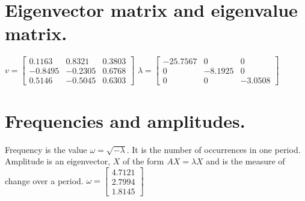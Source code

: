 \documentclass{article}
\begin{document}
\section{Eigenvector matrix and eigenvalue matrix.}
\(v = 
	\begin{bmatrix}
	 0.1163	&	0.8321	&	0.3803 \\
	 -0.8495	&	-0.2305	&	0.6768 \\
	 0.5146	&	-0.5045	&	0.6303
	\end{bmatrix} \)
\(\lambda =
	\begin{bmatrix}
	-25.7567	&	0		&	0 \\
	0		&	-8.1925	&	0 \\
	0		&	0		&	-3.0508
	\end{bmatrix} \)

\section{Frequencies and amplitudes.}
Frequency is the value \(\omega = \sqrt{-\lambda}\). It is the number of occurrences in one period. Amplitude is an eigenvector, \(X\) of the form \(AX = \lambda X\) and is the measure of change over a period.
\(\omega = 
	\begin{bmatrix}
	4.7121	\\	
	2.7994	\\
	1.8145
	\end{bmatrix} \)
\end{document}
